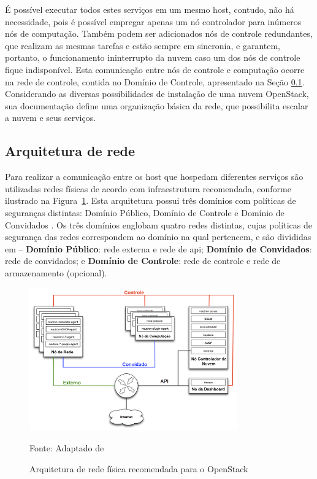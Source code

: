 É possível executar todos estes serviços em um mesmo host, contudo, não há necessidade, pois é possível empregar apenas um nó controlador para inúmeros nós de computação.
%
Também podem ser adicionados nós de controle redundantes, que realizam as mesmas tarefas e estão sempre em sincronia, e garantem, portanto, o funcionamento ininterrupto da nuvem caso um dos nós de controle fique indisponível.
%
Esta comunicação entre nós de controle e computação ocorre na rede de controle, contida no Domínio de Controle, apresentado na Seção \ref{cap2:openstack_network_architecture}.
%
Considerando as diversas possibilidades de instalação de uma nuvem OpenStack, sua documentação define uma organização básica da rede, que possibilita escalar a nuvem e seus serviços.

\subsection{Arquitetura de rede}
\label{cap2:openstack_network_architecture}

Para realizar a comunicação entre os host que hospedam diferentes serviços são utilizadas redes físicas de acordo com infraestrutura recomendada, conforme ilustrado na Figura~\ref{fig:openstack_network_architecture}. 
%
Esta arquitetura possui três domínios com políticas de seguranças distintas: Domínio Público, Domínio de Controle e Domínio de Convidados \cite{openstack:newton}. 
%
Os três domínios englobam quatro redes distintas, cujas políticas de segurança das redes correspondem ao domínio na qual pertencem, e são divididas em -- \textbf{Domínio Público}: rede externa e rede de \ac{api}; \textbf{Domínio de Convidados}: rede de convidados; e \textbf{Domínio de Controle}: rede de controle e rede de armazenamento (opcional).

\vspace{-0.4cm}
\begin{figure}[!htb]
	\centering
	\includegraphics[width=0.8\textwidth]{img/openstack_arquitetura_rede.png}
    \vspace{-0.3cm}
	\caption{Arquitetura de rede física recomendada para o OpenStack}
	\label{fig:openstack_network_architecture}
	Fonte: Adaptado de \cite{openstack:networkguide}
\end{figure}

